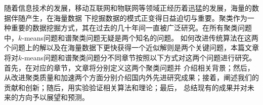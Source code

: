 	
\begin{chineseabstract}
随着信息技术的发展，移动互联网和物联网等领域正经历着迅猛的发展，海量的数据伴随产生，在海量数据
下挖掘数据的模式正变得日益迫切与重要。聚类作为一种重要的数据挖掘方式，其在过去的几十年间一直被广泛研究。在所有聚类问题中，$k$-means问题和谱聚类问题无疑是两个知名的问题。
如何改进传统算法在这两个问题上的解以及在海量数据下更快获得一个近似解则是两个关键问题，本篇文章将对$k$-means问题和谱聚类问题分不同章节按照以下方式对这两个问题进行研究。首先，在对应的章节，文章将分别定义这两个聚类问题并
介绍相关背景；然后，从改进聚类质量和加速两个方面分别介绍国内外先进研究成果；接着，阐述我们的贡献和创新；随后，用实验验证相关算法和理论；最后， 总结现有的成果并对未来的方向予以展望和预测。

\end{chineseabstract}


